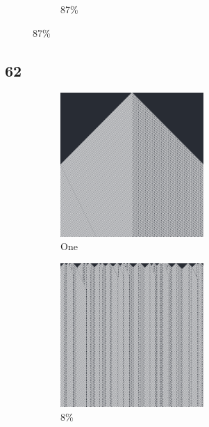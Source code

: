 \documentclass[12pt, fleqn]{report}                             %
\theoremstyle{break}                                            %
\begin{document}
\begin{figure}[ht!]
\begin{subfigure}[b]{0.4\linewidth}
          \caption{87\%}
        \end{subfigure}
      \end{figure}


      \clearpage
      \subsection{62}
      \begin{figure}[ht!]
        \centering
        \begin{subfigure}[b]{0.4\linewidth}
          \includegraphics[width=0.6\textwidth]{Images/62/a.png}
          \caption{One}
        \end{subfigure}
        \begin{subfigure}[b]{0.4\linewidth}
          \includegraphics[width=0.6\textwidth]{Images/62/b.png}
          \caption{8\%}
        \end{subfigure}
        \begin{subfigure}[b]{0.4\linewidth}

\end{subfigure}
\end{figure}
\end{document}
